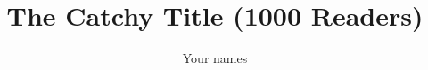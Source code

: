 \documentclass{llncs}
\title{The Catchy Title (1000 Readers)}
\author{Your names}
\institute{Hasso Plattner Institute, Potsdam, Germany}
\begin{document}
\maketitle

\begin{abstract}

\end{abstract}















\newpage


\end{document}
